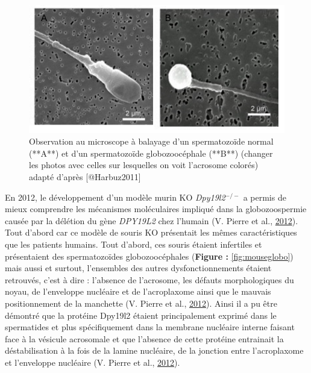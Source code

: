 \documentclass[12pt,twoside]{reedthesis}
\theoremstyle{definition}
\theoremstyle{definition}
\theoremstyle{remark}
\begin{document}
  \begin{figure}
  
  {\centering \includegraphics[scale=0.50]{figure/globo_normal_spz} 
  
  }
  
  \caption[Observation au microscope à balayage d'un spermatozoïde normal (**A**) et d'un spermatozoïde globozoocéphale (**B**) (changer les photos avec celles sur lesquelles on voit l'acrosome colorés)]{Observation au microscope à balayage d'un spermatozoïde normal (**A**) et d'un spermatozoïde globozoocéphale (**B**) (changer les photos avec celles sur lesquelles on voit l'acrosome colorés) adapté d'après [@Harbuz2011]}\label{fig:globospz}
  \end{figure}
  
  En 2012, le développement d'un modèle murin KO \emph{Dpy19l2}\(^{-/-}\)
  a permis de mieux comprendre les mécanismes moléculaires impliqué dans
  la globozoospermie causée par la délétion du gène \emph{DPY19L2} chez
  l'humain (V. Pierre et al., \protect\hyperlink{ref-Pierre2012}{2012}).
  Tout d'abord car ce modèle de souris KO présentait les mêmes
  caractéristiques que les patients humains. Tout d'abord, ces souris
  étaient infertiles et présentaient des spermatozoïdes globozoocéphales
  (\textbf{Figure : }\ref{fig:mouseglobo}) mais aussi et surtout,
  l'ensembles des autres dysfonctionnements étaient retrouvés, c'est à
  dire : l'absence de l'acrosome, les défauts morphologiques du noyau, de
  l'enveloppe nucléaire et de l'acroplaxome ainsi que le mauvais
  positionnement de la manchette (V. Pierre et al.,
  \protect\hyperlink{ref-Pierre2012}{2012}). Ainsi il a pu être démontré
  que la protéine Dpy19l2 étaient principalement exprimé dans le
  spermatides et plus spécifiquement dans la membrane nucléaire interne
  faisant face à la vésicule acrosomale et que l'absence de cette protéine
  entrainait la déstabilisation à la fois de la lamine nucléaire, de la
  jonction entre l'acroplaxome et l'enveloppe nucléaire (V. Pierre et al.,
  \protect\hyperlink{ref-Pierre2012}{2012}).
  
\end{document}
